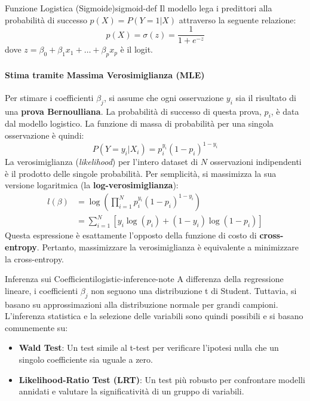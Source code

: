 \begin{definizione}{Funzione Logistica (Sigmoide)}{sigmoid-def}
Il modello lega i predittori alla probabilità di successo \(p(X) = P(Y=1 | X)\)
attraverso la seguente relazione:
\[
    p(X) = \sigma(z) = \frac{1}{1+e^{-z}}
\]
dove \(z = \beta_0 + \beta_1 x_1 + \dots + \beta_p x_p\) è il logit.
\end{definizione}

\paragraph{Stima tramite Massima Verosimiglianza (MLE)}
Per stimare i coefficienti \(\beta_j\), si assume che ogni osservazione \(y_i\)
sia il risultato di una \textbf{prova Bernoulliana}. La probabilità di successo
di questa prova, \(p_i\), è data dal modello logistico. La funzione di massa di
probabilità per una singola osservazione è quindi:
\[ P(Y=y_i | X_i) = p_i^{y_i}(1-p_i)^{1-y_i} \]
La verosimiglianza (\textit{likelihood}) per l'intero dataset di \(N\)
osservazioni indipendenti è il prodotto delle singole probabilità. Per
semplicità, si massimizza la sua versione logaritmica (la
\textbf{log-verosimiglianza}):
\begin{align*}
    l(\beta) &= \log \left( \prod_{i=1}^{N} p_i^{y_i}(1-p_i)^{1-y_i} \right) \\
    &= \sum_{i=1}^{N} \left[ y_i \log(p_i) + (1-y_i) \log(1-p_i) \right]
\end{align*}
Questa espressione è esattamente l'opposto della funzione di costo di
\textbf{cross-entropy}. Pertanto, massimizzare la verosimiglianza è equivalente
a minimizzare la cross-entropy.

\begin{nota}{Inferenza sui Coefficienti}{logistic-inference-note}
A differenza della regressione lineare, i coefficienti \(\beta_j\) non seguono
una distribuzione t di Student. Tuttavia, si basano su approssimazioni alla
distribuzione normale per grandi campioni. L'inferenza statistica e la selezione
delle variabili sono quindi possibili e si basano comunemente su:
\begin{itemize}
    \item \textbf{Wald Test}: Un test simile al t-test per verificare l'ipotesi
    nulla che un singolo coefficiente sia uguale a zero.
    \item \textbf{Likelihood-Ratio Test (LRT)}: Un test più robusto per
    confrontare modelli annidati e valutare la significatività di un gruppo di
    variabili.
\end{itemize}
\end{nota}

